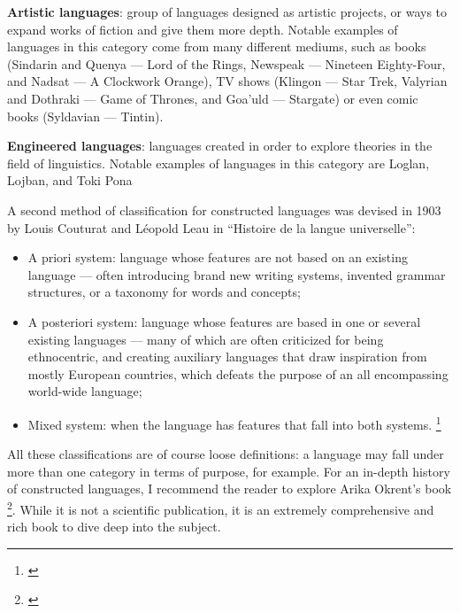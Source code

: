 \textbf{Artistic languages}: group of languages designed as artistic projects, or ways to expand works of fiction and give them more depth. Notable examples of languages
in this category come from many different mediums, such as books (Sindarin and Quenya --- Lord of the Rings, Newspeak --- Nineteen Eighty-Four, and  Nadsat --- A Clockwork Orange),
TV shows (Klingon --- Star Trek, Valyrian and Dothraki --- Game of Thrones, and Goa'uld --- Stargate) or even comic books (Syldavian --- Tintin).\newline

\textbf{Engineered languages}: languages created in order to explore theories in the field of linguistics. Notable examples of languages in this category are Loglan, Lojban, and Toki Pona\newline

A second method of classification for constructed languages was devised in 1903 by Louis Couturat and Léopold Leau in ``Histoire de la langue universelle'':

\begin{itemize}
    \setlength\itemsep{-0.5em}
    \item A priori system: language whose features are not based on an existing language --- often introducing brand new writing systems, invented grammar structures,
    or a taxonomy for words and concepts;
    \item A posteriori system: language whose features are based in one or several existing languages --- many of which are often criticized for being ethnocentric, and
    creating auxiliary languages that draw inspiration from mostly European countries, which defeats the purpose of an all encompassing world-wide language;
    \item Mixed system: when the language has features that fall into both systems. \footnote{\cite[Introduction, Pages XXVII and XXVIII]{couturat1903histoire}}
\end{itemize}

All these classifications are of course loose definitions: a language may fall under more than one category in terms of purpose, for example. For an in-depth history of
constructed languages, I recommend the reader to explore Arika Okrent's book \footnote{\cite{okrent2009land}}. While it is not a scientific publication, it is an extremely
comprehensive and rich book to dive deep into the subject.\newline

